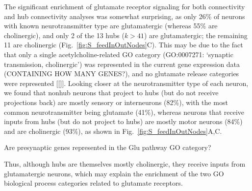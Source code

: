 \documentclass[10pt,letterpaper]{article}
\begin{document}
The significant enrichment of glutamate receptor signaling for both connectivity and hub connectivity analyses was somewhat surprising, as only 26\% of neurons with known neurotransmitter type are glutamatergic (whereas 55\% are cholinergic), and only 2 of the 13 hubs ($k > 41$) are glutamatergic; the remaining 11 are cholinergic (Fig.~\ref{fig:S_feedInOutNodes}C).
This may be due to the fact that only a single acetylcholine-related GO category (GO:0007271: `synaptic transmission, cholinergic') was represented in the current gene expression data (CONTAINING HOW MANY GENES?), and no glutamate release categories were represented [[]].
Looking closer at the neurotransmitter type of each neuron, we found that nonhub neurons that project to hubs (but do not receive projections back) are mostly sensory or interneurons (82\%), with the most common neurotransmitter being glutamate (41\%), whereas neurons that receive inputs from hubs (but do not project to hubs) are mostly motor neurons (84\%) and are cholinergic (93\%), as shown in Fig.~\ref{fig:S_feedInOutNodes}A,C.

Are presynaptic genes represented in the Glu pathway GO category?

Thus, although hubs are themselves mostly cholinergic, they receive inputs from glutamatergic neurons, which may explain the enrichment of the two GO biological process categories related to glutamate receptors.
\end{document}
